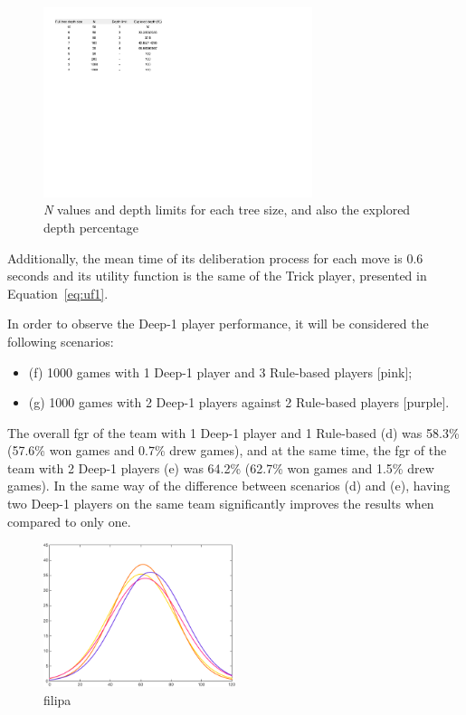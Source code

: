 \begin{figure}[h!]
  \centering
    \includegraphics[width=0.7\textwidth]{./img/4/nDepthLimits}
  \caption{\emph{N} values and depth limits for each tree size, and also the explored depth percentage}
\label{fig:nDepthLimits}
\end{figure}
Additionally, the mean time of its deliberation process for each move is 0.6 seconds and its utility function is the same of the Trick player, presented in Equation~\ref{eq:uf1}.

In order to observe the Deep-1 player performance, it will be considered the following scenarios:
\begin{itemize}
\item (f) 1000 games with 1 Deep-1 player and 3 Rule-based players [pink];
\item (g) 1000 games with 2 Deep-1 players against 2 Rule-based players [purple].
\end{itemize}

The overall \ac{fgr} of the team with 1 Deep-1 player and 1 Rule-based (d) was 58.3\% (57.6\% won games and 0.7\% drew games), and at the same time, the \ac{fgr} of the team with 2 Deep-1 players (e) was 64.2\% (62.7\% won games and 1.5\% drew games).
In the same way of the difference between scenarios (d) and (e), having two Deep-1 players on the same team significantly improves the results when compared to only one.

\begin{figure}[h!]
  \centering
    \includegraphics[width=0.5\textwidth]{./img/4/DEFG}
  \caption{filipa}
\label{fig:DEFG}
\end{figure}

